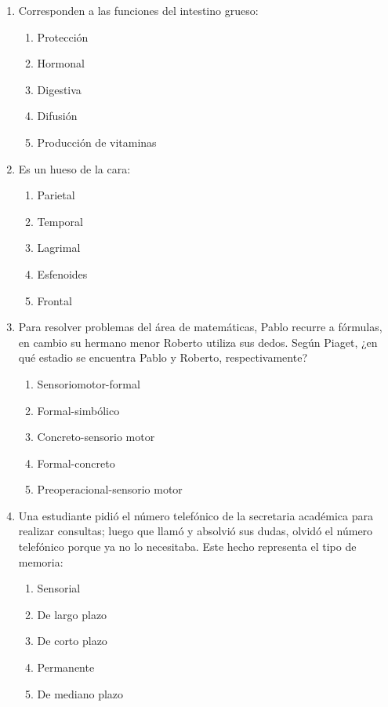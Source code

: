 \begin{enumerate}
	\item Corresponden a las funciones del intestino grueso:
	\begin{enumerate}[label=\alph*)]
		\item Protección
		\item Hormonal
		\item Digestiva
		\item Difusión
		\item Producción de vitaminas
	\end{enumerate}
	
	\item Es un hueso de la cara:
	\begin{enumerate}[label=\alph*)]
		\item Parietal
		\item Temporal
		\item Lagrimal
		\item Esfenoides
		\item Frontal
	\end{enumerate}
	
	\item Para resolver problemas del área de matemáticas, Pablo recurre a fórmulas, en cambio su hermano menor Roberto utiliza sus dedos. Según Piaget, ¿en qué estadio se encuentra Pablo y Roberto, respectivamente?
	\begin{enumerate}[label=\alph*)]
		\item Sensoriomotor-formal
		\item Formal-simbólico
		\item Concreto-sensorio motor
		\item Formal-concreto
		\item Preoperacional-sensorio motor
	\end{enumerate}
	
	\item Una estudiante pidió el número telefónico de la secretaria académica para realizar consultas; luego que llamó y absolvió sus dudas, olvidó el número telefónico porque ya no lo necesitaba. Este hecho representa el tipo de memoria:
	\begin{enumerate}[label=\alph*)]
		\item Sensorial
		\item De largo plazo
		\item De corto plazo
		\item Permanente
		\item De mediano plazo
	\end{enumerate}
	

\end{enumerate}
